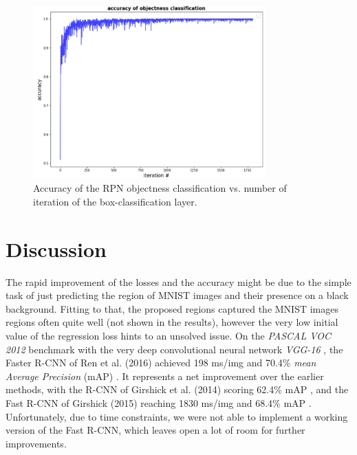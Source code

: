 \documentclass[a4paper]{article}
\begin{document}
\begin{figure}
\centering
\includegraphics[width=0.8\textwidth]{rpn_accuracy.jpg}
\caption{\label{fig:rpn_accuracy} Accuracy of the RPN objectness classification vs. number of iteration of the box-classification layer.}
\end{figure}

\newpage

\section{Discussion}

The rapid improvement of the losses and the accuracy might be due to the simple task of just predicting the region of MNIST images and their presence on a black background. Fitting to that, the proposed regions captured the MNIST images regions often quite well (not shown in the results), however the very low initial value of the regression loss hints to an unsolved issue.
On the \emph{PASCAL VOC 2012} benchmark \cite{voc} with the very deep convolutional neural network \emph{VGG-16} \cite{vgg}, the Faster R-CNN of Ren et al. (2016) achieved 198 ms/img and 70.4\% \emph{mean Average Precision} (mAP) \cite{fasterrcnn}. It represents a net improvement over the earlier methods, with the R-CNN of Girshick et al. (2014) scoring 62.4\% mAP \cite{fastrcnn}, and the Fast R-CNN of Girshick (2015) reaching 1830 ms/img and 68.4\% mAP \cite{fasterrcnn}.
Unfortunately, due to time constraints, we were not able to implement a working version of the Fast R-CNN, which leaves open a lot of room for further improvements.

\newpage
\end{document}

